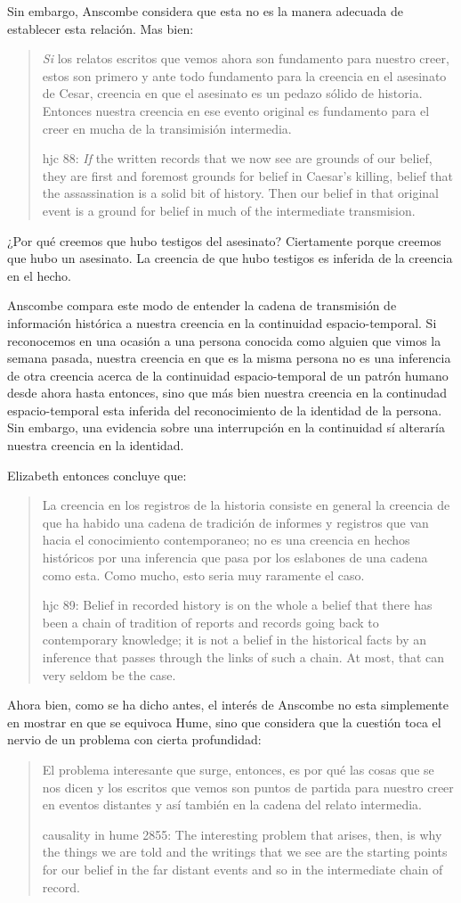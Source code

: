 Sin embargo, Anscombe considera que esta no es la manera adecuada de establecer
esta relación. Mas bien: \blockquote[hjc 88: \emph{If} the written records that
we now see are grounds of our belief, they are first and foremost grounds for
belief in Caesar's killing, belief that the assassination is a solid bit of
history. Then our belief in that original event is a ground for belief in much
of the intermediate transmision.]{\emph{Si} los relatos escritos que vemos ahora
  son fundamento para nuestro creer, estos son primero y ante todo fundamento
  para la creencia en el asesinato de Cesar, creencia en que el asesinato es un
  pedazo sólido de historia. Entonces nuestra creencia en ese evento original es
  fundamento para el creer en mucha de la transimisión intermedia.}
¿Por qué creemos que hubo testigos del asesinato? Ciertamente porque creemos que
hubo un asesinato. La creencia de que hubo testigos es inferida de la creencia
en el hecho.

Anscombe compara este modo de entender la cadena de transmisión de información
histórica a nuestra creencia en la continuidad espacio-temporal. Si reconocemos
en una ocasión a una persona conocida como alguien que vimos la semana pasada,
nuestra creencia en que es la misma persona no es una inferencia de otra
creencia acerca de la continuidad espacio-temporal de un patrón humano desde
ahora hasta entonces, sino que más bien nuestra creencia en la continudad
espacio-temporal esta inferida del reconocimiento de la identidad de la persona.
Sin embargo, una evidencia sobre una interrupción en la continuidad sí alteraría
nuestra creencia en la identidad.

Elizabeth entonces concluye que: \blockquote[hjc 89: Belief in recorded history is
on the whole a belief that there has been a chain of tradition of reports and
records going back to contemporary knowledge; it is not a belief in the
historical facts by an inference that passes through the links of such a chain.
At most, that can very seldom be the case.]{La creencia en los registros de la
  historia consiste en general la creencia de que ha habido una cadena de
  tradición de informes y registros que van hacia el conocimiento contemporaneo;
  no es una creencia en hechos históricos por una inferencia que pasa por los
  eslabones de una cadena como esta. Como mucho, esto seria muy raramente el
  caso.}

Ahora bien, como se ha dicho antes, el interés de Anscombe no esta simplemente
en mostrar en que se equivoca Hume, sino que considera que la cuestión toca el
nervio de un problema con cierta profundidad:
\blockquote[causality in hume 2855: The interesting problem that arises, then,
is why the things we are told and the writings that we see are the starting
points for our belief in the far distant events and so in the intermediate chain
of record.]{El problema interesante que surge, entonces, es por qué las cosas
  que se nos dicen y los escritos que vemos son puntos de partida para nuestro
  creer en eventos distantes y así también en la cadena del relato intermedia.}



